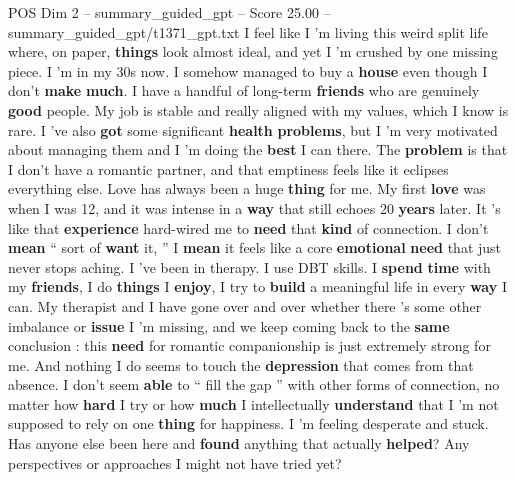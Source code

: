 \begin{textsample}{POS Dim 2 – summary\_guided\_gpt – Score 25.00 – summary\_guided\_gpt/t1371\_gpt.txt}  \label{ex:f2_pos_005}
I feel like I ’m living this weird split life where, on paper, \textbf{things} look almost ideal, and yet I ’m crushed by one missing piece.
I ’m in my 30s now.
I somehow managed to buy a \textbf{house} even though I don't \textbf{make} \textbf{much}.
I have a handful of long-term \textbf{friends} who are genuinely \textbf{good} people.
My job is stable and really aligned with my values, which I know is rare.
I ’ve also \textbf{got} some significant \textbf{health} \textbf{problems}, but I ’m very motivated about managing them and I ’m doing the \textbf{best} I can there.
The \textbf{problem} is that I don't have a romantic partner, and that emptiness feels like it eclipses everything else.
Love has always been a huge \textbf{thing} for me.
My first \textbf{love} was when I was 12, and it was intense in a \textbf{way} that still echoes 20 \textbf{years} later.
It ’s like that \textbf{experience} hard-wired me to \textbf{need} that \textbf{kind} of connection.
I don't \textbf{mean} “ sort of \textbf{want} it, ” I \textbf{mean} it feels like a core \textbf{emotional} \textbf{need} that just never stops aching.
I ’ve been in therapy.
I use DBT skills.
I \textbf{spend} \textbf{time} with my \textbf{friends}, I do \textbf{things} I \textbf{enjoy}, I try to \textbf{build} a meaningful life in every \textbf{way} I can.
My therapist and I have gone over and over whether there ’s some other imbalance or \textbf{issue} I ’m missing, and we keep coming back to the \textbf{same} conclusion : this \textbf{need} for romantic companionship is just extremely strong for me.
And nothing I do seems to touch the \textbf{depression} that comes from that absence.
I don't seem \textbf{able} to “ fill the gap ” with other forms of connection, no matter how \textbf{hard} I try or how \textbf{much} I intellectually \textbf{understand} that I ’m not supposed to rely on one \textbf{thing} for happiness.
I ’m feeling desperate and stuck.
Has anyone else been here and \textbf{found} anything that actually \textbf{helped}?
Any perspectives or approaches I might not have tried yet?

\end{textsample}

